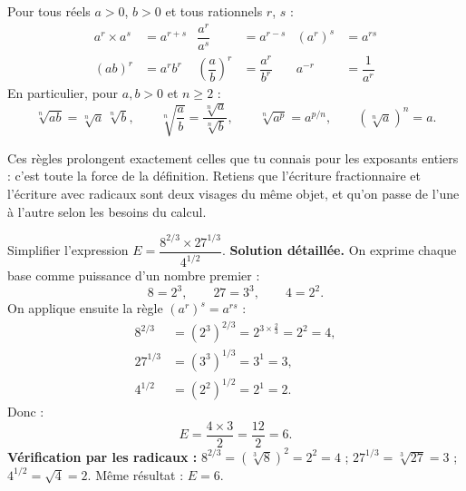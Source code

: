\documentclass[11pt]{article}
\begin{document}
\begin{propriete}
Pour tous réels $a > 0$, $b > 0$ et tous rationnels $r$, $s$ :
\begin{align*}
a^r \times a^s &= a^{r+s} & \dfrac{a^r}{a^s} &= a^{r-s} & \left(a^r\right)^s &= a^{rs} \\
(ab)^r &= a^r b^r & \left(\dfrac{a}{b}\right)^r &= \dfrac{a^r}{b^r} & a^{-r} &= \dfrac{1}{a^r}
\end{align*}
En particulier, pour $a, b > 0$ et $n \geq 2$ :
\[ \sqrt[n]{ab} = \sqrt[n]{a}\,\sqrt[n]{b}, \qquad \sqrt[n]{\dfrac{a}{b}} = \dfrac{\sqrt[n]{a}}{\sqrt[n]{b}}, \qquad \sqrt[n]{a^p} = a^{p/n}, \qquad \left(\sqrt[n]{a}\right)^n = a. \]
\end{propriete}

Ces règles prolongent exactement celles que tu connais pour les exposants entiers : c'est toute la force de la définition. Retiens que l'écriture fractionnaire et l'écriture avec radicaux sont deux visages du même objet, et qu'on passe de l'une à l'autre selon les besoins du calcul.

\begin{exoresolu}
Simplifier l'expression $E = \dfrac{8^{2/3} \times 27^{1/3}}{4^{1/2}}$.
\tcblower
\textbf{Solution détaillée.} On exprime chaque base comme puissance d'un nombre premier :
\[ 8 = 2^3, \qquad 27 = 3^3, \qquad 4 = 2^2. \]
On applique ensuite la règle $(a^r)^s = a^{rs}$ :
\begin{align*}
8^{2/3} &= \left(2^3\right)^{2/3} = 2^{3 \times \frac{2}{3}} = 2^2 = 4, \\
27^{1/3} &= \left(3^3\right)^{1/3} = 3^{1} = 3, \\
4^{1/2} &= \left(2^2\right)^{1/2} = 2^{1} = 2.
\end{align*}
Donc :
\[ E = \dfrac{4 \times 3}{2} = \dfrac{12}{2} = 6. \]
\textbf{Vérification par les radicaux :} $8^{2/3} = \left(\sqrt[3]{8}\right)^2 = 2^2 = 4$ ; $27^{1/3} = \sqrt[3]{27} = 3$ ; $4^{1/2} = \sqrt{4} = 2$. Même résultat : $E = 6$.
\end{exoresolu}
\end{document}
